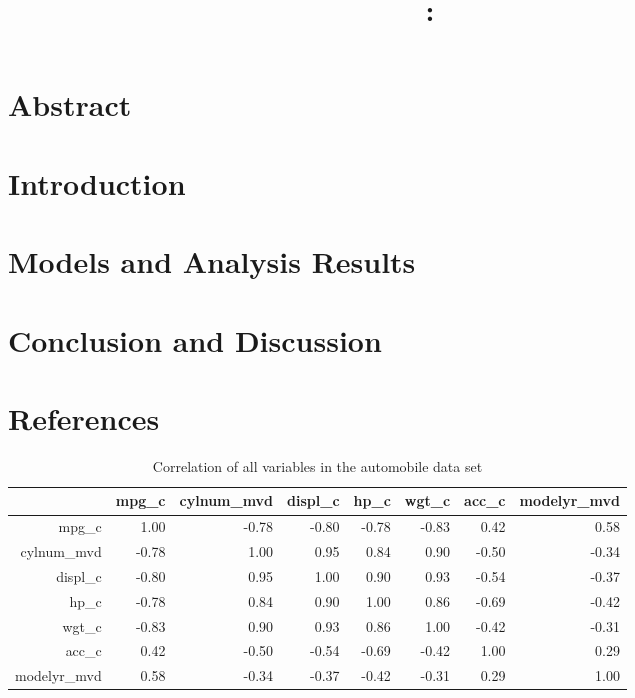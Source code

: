 \documentclass{article}
\title{
    \vspace{2in}
    \textmd{\textbf{\hmwkClass:\ \hmwkTitle}}\\
    \normalsize\vspace{0.1in}\small\vspace{0.1in}\large{\textit{\hmwkClassInstructor}}
    \vspace{3in}
}
\author{\hmwkAuthorName}
\date{}
\begin{document}
\maketitle

\newpage

\tableofcontents

\listoftables

\listoffigures

\section{Abstract}
\section{Introduction}
\section{Models and Analysis Results}
\section{Conclusion and Discussion}
\section{References}

\newpage

\begin{table}[ht]
\centering
\begin{tabular}{rrrrrrrr}
  \hline
 & mpg\_c & cylnum\_mvd & displ\_c & hp\_c & wgt\_c & acc\_c & modelyr\_mvd \\ 
  \hline
mpg\_c & 1.00 & -0.78 & -0.80 & -0.78 & -0.83 & 0.42 & 0.58 \\ 
  cylnum\_mvd & -0.78 & 1.00 & 0.95 & 0.84 & 0.90 & -0.50 & -0.34 \\ 
  displ\_c & -0.80 & 0.95 & 1.00 & 0.90 & 0.93 & -0.54 & -0.37 \\ 
  hp\_c & -0.78 & 0.84 & 0.90 & 1.00 & 0.86 & -0.69 & -0.42 \\ 
  wgt\_c & -0.83 & 0.90 & 0.93 & 0.86 & 1.00 & -0.42 & -0.31 \\ 
  acc\_c & 0.42 & -0.50 & -0.54 & -0.69 & -0.42 & 1.00 & 0.29 \\ 
  modelyr\_mvd & 0.58 & -0.34 & -0.37 & -0.42 & -0.31 & 0.29 & 1.00 \\ 
   \hline
\end{tabular}
\caption{Correlation of all variables in the automobile data set}
\label{tab:myfirsttable}
\end{table}
\end{document}

